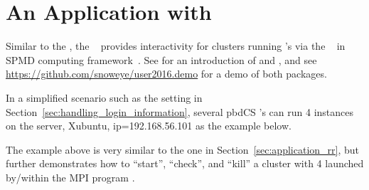 
\section[An Application with \pkg{pbdCS}]{An Application with }
\label{sec:application_cs}

Similar to the , the ~\citep{pbdCS} provides
interactivity for clusters running 's via the
~\citep{Chen2012pbdMPIpackage} in SPMD computing
framework~\citep{pbdR2012,hpsc2012}.
See \citet{xsede16} for an introduction of  and , and
see \url{https://github.com/snoweye/user2016.demo}
for a demo of both packages.

In a simplified scenario such as the setting in
Section~\ref{sec:handling_login_information},
several pbdCS 's can run 4 instances on the server,
Xubuntu, ip=192.168.56.101 as the example below.
The example above is very similar to the one in
Section~\ref{sec:application_rr}, but further demonstrates
how to ``start'', ``check'', and ``kill''
a  cluster with 4  launched by/within
the MPI program .

